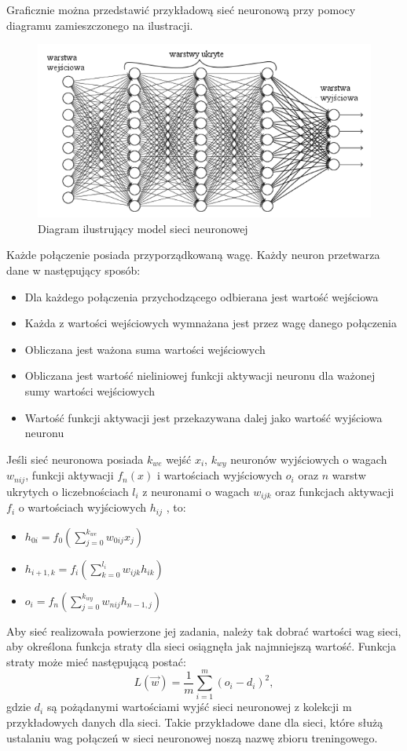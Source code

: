 \documentclass{classrep}
\begin{document}
{\begin{itemize}
    \end{itemize}
Graficznie można przedstawić przykładową sieć neuronową przy pomocy diagramu zamieszczonego na ilustracji.
    \begin{figure}[!htbp]
            \centering
            \includegraphics[width=\textwidth, width=150mm]{neuro_mat.png}
            \caption{Diagram ilustrujący model sieci neuronowej}
            \label{neuro_mat}
    \end{figure}
Każde połączenie posiada przyporządkowaną wagę. Każdy neuron przetwarza dane w następujący sposób: 
     \begin{itemize}
            \item Dla każdego połączenia przychodzącego odbierana jest wartość wejściowa
	\item Każda z wartości wejściowych wymnażana jest przez wagę danego połączenia
	\item Obliczana jest ważona suma wartości wejściowych
           \item Obliczana jest wartość nieliniowej funkcji aktywacji neuronu dla ważonej sumy wartości wejściowych
           \item Wartość funkcji aktywacji jest przekazywana dalej jako wartość wyjściowa neuronu
           
      \end{itemize}

Jeśli sieć neuronowa posiada $k_{we}$ wejść $x_i$, ${k_{wy}}$ neuronów wyjściowych o wagach $w_{nij}$, funkcji aktywacji $f_n(x)$ i wartościach wyjściowych $o_i$ oraz $n$ warstw ukrytych o liczebnościach $l_i$ z neuronami o wagach $w_{ijk}$ oraz funkcjach aktywacji $f_{i}$ o wartościach wyjściowych $h_{ij}$ , to:
    \begin{itemize}
            \item $h_{0i} = f_0(\sum_{j=0}^{k_{we}} w_{0ij}x_{j})$
	\item $h_{i+1, k} =f_i(\sum_{k=0}^{l_i} w_{ijk}h_{ik}) $
	\item $o_i = f_n(\sum_{j=0}^{k_{wy}} w_{nij} h_{n-1, j})$ 
      \end{itemize}
}
Aby sieć realizowała powierzone jej zadania, należy tak dobrać wartości wag sieci, aby określona funkcja straty dla sieci osiągnęła jak najmniejszą wartość.
Funkcja straty może mieć następującą postać:
$$L(\vec{w}) = \frac{1}{m} \sum_{i=1}^{m} (o_i-d_i)^2, $$ gdzie $d_i$ są pożądanymi wartościami wyjść sieci neuronowej z kolekcji m przykładowych danych dla sieci. Takie przykładowe dane dla sieci, które służą ustalaniu wag połączeń w sieci neuronowej noszą nazwę zbioru treningowego. 
\end{document}
